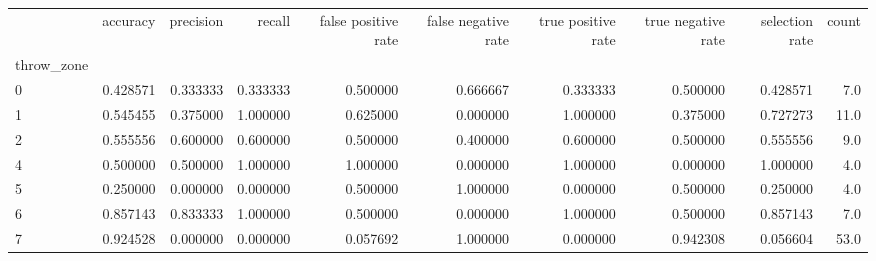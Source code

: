 \begin{tabular}{lrrrrrrrrr}
\toprule
{} &  accuracy &  precision &    recall &  false positive rate &  false negative rate &  true positive rate &  true negative rate &  selection rate &  count \\
throw\_zone &           &            &           &                      &                      &                     &                     &                 &        \\
\midrule
0          &  0.428571 &   0.333333 &  0.333333 &             0.500000 &             0.666667 &            0.333333 &            0.500000 &        0.428571 &    7.0 \\
1          &  0.545455 &   0.375000 &  1.000000 &             0.625000 &             0.000000 &            1.000000 &            0.375000 &        0.727273 &   11.0 \\
2          &  0.555556 &   0.600000 &  0.600000 &             0.500000 &             0.400000 &            0.600000 &            0.500000 &        0.555556 &    9.0 \\
4          &  0.500000 &   0.500000 &  1.000000 &             1.000000 &             0.000000 &            1.000000 &            0.000000 &        1.000000 &    4.0 \\
5          &  0.250000 &   0.000000 &  0.000000 &             0.500000 &             1.000000 &            0.000000 &            0.500000 &        0.250000 &    4.0 \\
6          &  0.857143 &   0.833333 &  1.000000 &             0.500000 &             0.000000 &            1.000000 &            0.500000 &        0.857143 &    7.0 \\
7          &  0.924528 &   0.000000 &  0.000000 &             0.057692 &             1.000000 &            0.000000 &            0.942308 &        0.056604 &   53.0 \\
\bottomrule
\end{tabular}

